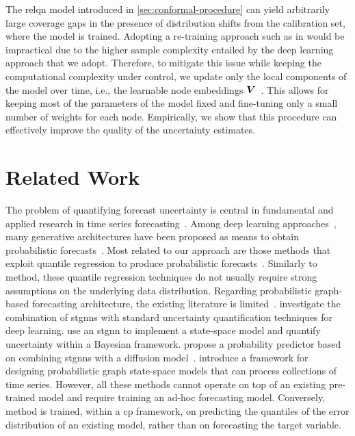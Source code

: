 The \gls{relqn} model introduced in \autoref{sec:conformal-procedure} can yield arbitrarily large coverage gaps in the presence of distribution shifts from the calibration set, where the model is trained.
Adopting a re-training approach such as in \citet{xu2023sequential} would be impractical due to the higher sample complexity entailed by the deep learning approach that we adopt. 
Therefore, to mitigate this issue while keeping the computational complexity under control, we update only the local components of the model over time, i.e., the learnable node embeddings ${\bm{V}}$~\cite{cini2023taming}. This allows for keeping most of the parameters of the model fixed and fine-tuning only a small number of weights for each node. Empirically, we show that this procedure can effectively improve the quality of the uncertainty estimates.




\section{Related Work}\label{sec:related}

The problem of quantifying forecast uncertainty is central in fundamental and applied research in time series forecasting~\cite{hyndman2018forecasting, petropoulos2022forecasting}. Among deep learning approaches~\cite{benidis2022deep}, many generative architectures have been proposed as means to obtain probabilistic forecasts~\cite{salinas2020deepar,rangapuram2018deep, debezenac2020normalizing, rasul2021autoregressive}. Most related to our approach are those methods that exploit quantile regression to produce probabilistic forecasts~\cite{wen2017multi, gasthaus2019probabilistic, kan2022multivariate, gouttes2021probabilistic}. 
Similarly to \gls{method}, these quantile regression techniques do not usually require strong assumptions on the underlying data distribution.  
Regarding probabilistic graph-based forecasting architecture, the existing literature is limited~\cite{jin2023survey, cini2023graphdeep}. \citet{wu2021quantifying} investigate the combination of \glspl{stgnn} with standard uncertainty quantification techniques for deep learning. \citet{pal2021rnn} use an \gls{stgnn} to implement a state-space model and quantify uncertainty within a Bayesian framework. \citet{wen2023diffstg} propose a probability predictor based on combining \glspl{stgnn} with a diffusion model~\cite{ho2020denoising}. \citet{zambon2023graph} introduce a framework for designing probabilistic graph state-space models that can process collections of time series. However, all these methods cannot operate on top of an existing pre-trained model and require training an ad-hoc forecasting model. Conversely, \gls{method} is trained, within a \gls{cp} framework, on predicting the quantiles of the error distribution of an existing model, rather than on forecasting the target variable.

